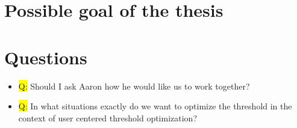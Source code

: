 \documentclass[12pt,a4paper]{article}
\begin{document}
\section{Possible goal of the thesis}

%
%
%
%
%
\section*{Questions}
\begin{itemize}
%
\item \colorbox{yellow}{Q:} Should I ask Aaron how he would like us to work together?
%
\item \colorbox{yellow}{Q:} In what situations exactly do we want to optimize the threshold in the context of user centered threshold optimization?
%
\end{itemize}
\end{document}
